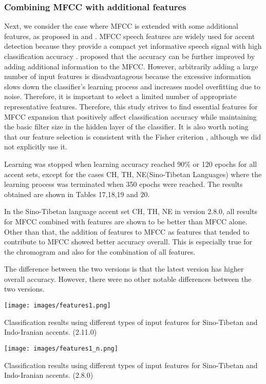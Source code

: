 \documentclass[ams]{U-AizuGT}
\begin{document}
\subsubsection{Combining MFCC with additional features}
Next, we consider the case where MFCC is extended with some additional features, as proposed in \cite{Singh:fea} and \cite{Veranika:lang}. MFCC speech features are widely used for accent detection because they provide a compact yet informative speech signal with high classification accuracy \cite{Jiang:tow, Singh:fea}. proposed that the accuracy can be further improved by adding additional information to the MFCC. However, arbitrarily adding a large number of input features is disadvantageous because the excessive information slows down the classifier's learning process and increases model overfitting due to noise. Therefore, it is important to select a limited number of appropriate representative features. Therefore, this study strives to find essential features for MFCC expansion that positively affect classification accuracy while maintaining the basic filter size in the hidden layer of the classifier. It is also worth noting that our feature selection is consistent with the Fisher criterion \cite{Longford:afa, Wu:fea, Sun:fea}, although we did not explicitly use it.\par
Learning was stopped when learning accuracy reached 90\% or 120 epochs for all accent sets, except for the cases {CH, TH, NE}(Sino-Tibetan Languages) where the learning process was terminated when 350 epochs were reached. The results obtained are shown in Tables 17,18,19 and 20.\par
In the Sino-Tibetan language accent set {CH, TH, NE} in version 2.8.0, all results for MFCC combined with features are shown to be better than MFCC alone. Other than that, the addition of features to MFCC as features that tended to contribute to MFCC showed better accuracy overall. This is especially true for the chromogram and also for the combination of all features.\par
The difference between the two versions is that the latest version has higher overall accuracy. However, there were no other notable differences between the two versions.
\begin{table}[h]
    \centering
    \texttt{[image: images/features1.png]}
    \caption{Classification results using different types of input features for Sino-Tibetan and Indo-Iranian accents. (2.11.0)}
\end{table}
\begin{table}[h]
    \centering
    \texttt{[image: images/features1\_n.png]}
    \caption{Classification results using different types of input features for Sino-Tibetan and Indo-Iranian accents. (2.8.0)}
\end{table}
\end{document}
